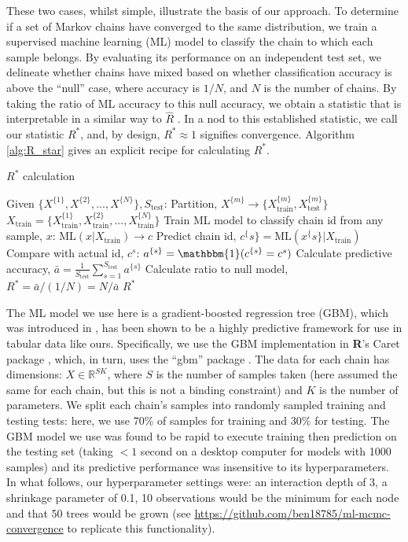 \documentclass{article}
\begin{document}
These two cases, whilst simple, illustrate the basis of our approach. To determine if a set of Markov chains have converged to the same distribution, we train a supervised machine learning (ML) model to classify the chain to which each sample belongs. By evaluating its performance on an independent test set, we delineate whether chains have mixed based on whether classification accuracy is above the ``null'' case, where accuracy is $1/{N}$, and $N$ is the number of chains. By taking the ratio of ML accuracy to this null accuracy, we obtain a statistic that is interpretable in a similar way to $\hat{R}$ \cite{gelman2013bayesian}. In a nod to this established statistic, we call our statistic $R^*$, and, by design, $R^*\approx 1$ signifies convergence. Algorithm \ref{alg:R_star} gives an explicit recipe for calculating $R^*$.

\begin{algorithm}[tb]
	\caption{$R^*$ calculation}
	\label{alg:R_star}
	\begin{algorithmic}
		\STATE Given $\{X^{\{1\}},X^{\{2\}},...,X^{\{N\}}\}, S_\text{test}$:
		\STATE Partition, $X^{\{m\}}\rightarrow\{X^{\{m\}}_\text{train},X^{\{m\}}_\text{test}\}$
		\ENDFOR
		\STATE $X_\text{train} = \{X^{\{1\}}_\text{train},X^{\{2\}}_\text{train},...,X^{\{N\}}_\text{train}\}$
		\STATE Train ML model to classify chain id from any sample, $x$: $\text{ML}(x|X_\text{train}) \rightarrow c$
		\STATE Predict chain id, $c^\{s\} = \text{ML}(x^\{s\}|X_\text{train})$
		\STATE Compare with actual id, $c^s$: $a^{\{s\}}=\mathbbm{1}(c^{\{s\}}=c^s)$
		\ENDFOR
		\STATE Calculate predictive accuracy, $\bar{a} = \frac{1}{S_\text{test}} \sum_{s=1}^{S_\text{test}} a^{\{s\}}$
		\STATE Calculate ratio to null model, $R^* = \bar{a} / (1 / N) = N/\bar{a}$
		\RETURN $R^*$
	\end{algorithmic}
\end{algorithm}

The ML model we use here is a gradient-boosted regression tree (GBM), which was introduced in \cite{friedman2001greedy}, has been shown to be a highly predictive framework for use in tabular data \cite{chollet2018} like ours. Specifically, we use the GBM implementation in \textbf{\textsf{R}}'s Caret package \cite{kuhn2008building}, which, in turn, uses the ``gbm'' package \cite{greenwell2019package}. The data for each chain has dimensions: $X\in \mathbb{R}^{SK}$, where $S$ is the number of samples taken (here assumed the same for each chain, but this is not a binding constraint) and $K$ is the number of parameters. We split each chain's samples into randomly sampled training and testing tests: here, we use 70\% of samples for training and 30\% for testing. The GBM model we use was found to be rapid to execute training then prediction on the testing set (taking $<1$ second on a desktop computer for models with 1000 samples) and its predictive performance was insensitive to its hyperparameters. In what follows, our hyperparameter settings were: an interaction depth of 3, a shrinkage parameter of 0.1, 10 observations would be the minimum for each node and that 50 trees would be grown (see \url{https://github.com/ben18785/ml-mcmc-convergence} to replicate this functionality).
\end{document}
